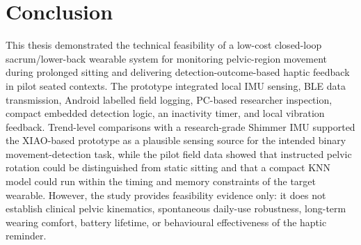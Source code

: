 \chapter{Conclusion}\label{ch:conclusion}

This thesis demonstrated the technical feasibility of a low-cost closed-loop sacrum/lower-back wearable system for monitoring pelvic-region movement during prolonged sitting and delivering detection-outcome-based haptic feedback in pilot seated contexts. The prototype integrated local IMU sensing, BLE data transmission, Android labelled field logging, PC-based researcher inspection, compact embedded detection logic, an inactivity timer, and local vibration feedback. Trend-level comparisons with a research-grade Shimmer IMU supported the XIAO-based prototype as a plausible sensing source for the intended binary movement-detection task, while the pilot field data showed that instructed pelvic rotation could be distinguished from static sitting and that a compact KNN model could run within the timing and memory constraints of the target wearable. However, the study provides feasibility evidence only: it does not establish clinical pelvic kinematics, spontaneous daily-use robustness, long-term wearing comfort, battery lifetime, or behavioural effectiveness of the haptic reminder.
